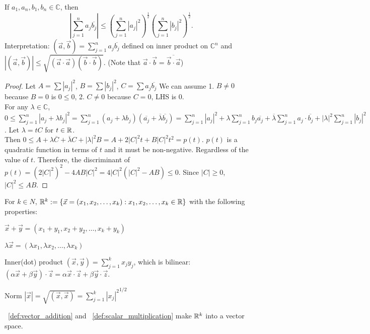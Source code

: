 \begin{theorem}
	If $a_1,a_n,b_1,b_n \in \mathbb{C}$, then
	\[
		|\sum_{j=1}^{n}{a_{j}\overline{b_{j}}}| \le (\sum_{j=1}^{n}{|a_{j}|^2})^{\frac{1}{2}}(\sum_{j=1}^{n}{|b_{j}|^2})^{\frac{1}{2}}
		.\]
	Interpretation: $(\vec{a},\vec{b})=\sum_{j=1}^{n}{a_j \overline{b_j}}$ defined
	on inner product on $\mathbb{C}^{n}$ and $|(\vec{a},\vec{b})|\le \sqrt{(\vec{a}\cdot \vec{a})(\vec{b} \cdot \vec{b})}$. (Note that $\vec{a}\cdot \vec{b}=\overline{\vec{b} \cdot \vec{a}}$)
	\begin{proof}
		Let $A=\sum{|a_j|^2}$, $B=\sum{|b_j|^2}$, $C=\sum{a_j \overline{b_j}}$
		We can assume 1. $B\neq 0$ because $B=0$ is $0\le 0$, 2. $C\neq 0$ because $C=0$, LHS is 0.\\
		For any $\lambda \in \mathbb{C}$, $0\le \sum_{j=1}^{n}|{a_j+\lambda b_j}|^2=\sum_{j=1}^{n}{(a_j+\lambda b_j)(\overline{a_j}+\overline{\lambda}\overline{b_j})}=\sum_{j=1}^{n}{|a_j|^2}+\lambda \sum_{j=1}^{n}{b_j \overline{a_j}}+\overline{\lambda}\sum_{j=1}^{n}{a_j \cdot \overline{b_j}+|\lambda|^2 \sum_{j=1}^{n}{|b_j|^2}}$.
		Let $\lambda=tC$ for $t \in \mathbb{R} $.\\
		Then $0\le A+\lambda \overline{C}+\overline{\lambda}C+|\lambda|^2B
			=A+2|C|^2t+B|C|^2t^2=p(t)$.
		$p(t)$ is a quadratic function in terms of $t$ and it must be non-negative. Regardless of the value of $t$. Therefore, the discriminant of $p(t)=(2|C|^2)^2-4AB|C|^2=4|C|^2(|C|^2-AB) \le 0$. Since $|C|\ge 0$, $|C|^2\le AB$.
	\end{proof}
\end{theorem}


\begin{definition}
	For $k \in N$, $\mathbb{R} ^{k}:=\{ \vec{x}=(x_1,x_2,\ldots,x_k):x_1,x_2,\ldots,x_k \in \mathbb{R}\}$ with the following properties:
	\begin{describe}
		\item[\namedlabel{def:vector_addition}{Addition}]  $\vec{x}+\vec{y}=(x_1+y_1,x_2+y_2,\ldots,x_k+y_k)$
		\item[\namedlabel{def:scalar_multiplication}{Scalar multiplication}] $\lambda \vec{x}=(\lambda x_1,\lambda x_2,\ldots,\lambda x_k)$
		\item[Inner(dot) product] $(\vec{x},\vec{y})=\sum_{j=1}^{k}{x_j y_j}$, which is bilinear: $(\alpha \vec{x}+\beta \vec{y})\cdot \vec{z}=\alpha \vec{x} \cdot  \vec{z} + \beta \vec{y} \cdot \vec{z}$.
		\item[Norm] $|\vec{x}|=\sqrt{(\vec{x},\vec{x})}={\sum_{j=1}^{k}{|x_j|^2}}^{1/2}$
	\end{describe}
	\begin{remark}
		~\ref*{def:vector_addition} and ~\ref*{def:scalar_multiplication} make $\mathbb{R} ^{k}$ into a vector space.
	\end{remark}
\end{definition}

